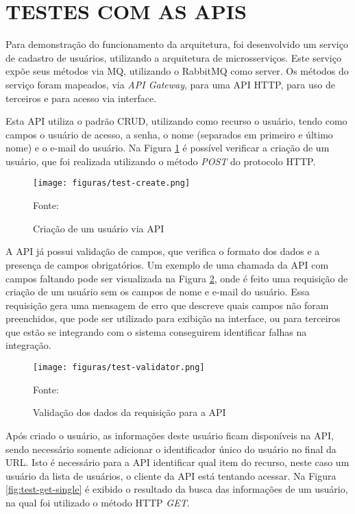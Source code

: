 \section{TESTES COM AS APIS}

Para demonstração do funcionamento da arquitetura, foi desenvolvido um
serviço de cadastro de usuários, utilizando a arquitetura de microsserviços.
Este serviço expõe seus métodos via \ac{MQ}, utilizando o RabbitMQ como server.
Os métodos do serviço foram mapeados, via \emph{API Gateway}, para uma
\ac{API} \ac{HTTP}, para uso de terceiros e para acesso via interface.

Esta \ac{API} utiliza o padrão \ac{CRUD}, utilizando como recurso o usuário,
tendo como campos o usuário de acesso, a senha, o nome (separados
em primeiro e último nome) e o e-mail do usuário. Na Figura
\ref{fig:test-create} é possível verificar a criação de um usuário, que
foi realizada utilizando o método \emph{POST} do protocolo \ac{HTTP}.

\begin{figure}[H]
	\centering
	\caption{Criação de um usuário via API}
	\texttt{[image: figuras/test-create.png]}

	\label{fig:test-create}
	\footnotesize Fonte: \fonteOAutor
\end{figure}

A \ac{API} já possui validação de campos, que verifica o formato dos dados
e a presença de campos obrigatórios. Um exemplo de uma chamada da \ac{API}
com campos faltando pode ser visualizada na Figura \ref{fig:test-validator},
onde é feito uma requisição de criação de um usuário sem os campos de nome
e e-mail do usuário. Essa requisição gera uma mensagem de erro que descreve
quais campos não foram preenchidos, que pode ser utilizado para exibição
na interface, ou para terceiros que estão se integrando com o sistema
conseguirem identificar falhas na integração.

\begin{figure}[H]
	\centering
	\caption{Validação dos dados da requisição para a API}
	\texttt{[image: figuras/test-validator.png]}

	\label{fig:test-validator}
	\footnotesize Fonte: \fonteOAutor
\end{figure}

Após criado o usuário, as informações deste usuário ficam disponíveis na
\ac{API}, sendo necessário somente adicionar o identificador único do usuário
no final da \ac{URL}. Isto é necessário para a \ac{API} identificar qual
item do recurso, neste caso um usuário da lista de usuários, o cliente da
\ac{API} está tentando acessar. Na Figura \ref{fig:test-get-single} é exibido
o resultado da busca das informações de um usuário, na qual foi utilizado o
método \ac{HTTP} \emph{GET}.

